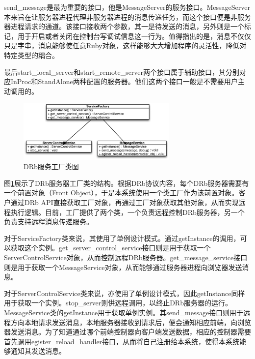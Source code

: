 send\_message是最为重要的接口，他是MessageServer的服务接口。MessageServer本来旨在让服务器进程代理非服务器进程的消息传递任务，而这个接口便是非服务器进程请求的通道。该接口接收两个参数，其一是待发送的消息，另外则是一个标记，用于开启或者关闭在控制台写调试信息这一行为。值得指出的是，消息不仅仅只是字串，消息能够使任意Ruby对象，这样能够大大增加程序的灵活性，降低对特定类型的耦合。

最后start\_local\_server和start\_remote\_server两个接口属于辅助接口，其分别对应InProc和StandAlone两种配置的服务器。他们这两个接口一般是不需要用户主动调用的。

\begin{figure}[h]
\centering
\includegraphics[width=0.7\textwidth]{images/detail/factory_class.eps}
\caption{DRb服务工厂类图}
\label{fig-factory-class}
\end{figure}

图\ref{fig-factory-class}展示了DRb服务器工厂类的结构。根据DRb协议内容，每个DRb服务器需要有一个前置对象（Front Object），于是本系统使用一个类工厂作为该前置对象。客户通过DRb API直接获取工厂对象，再通过工厂对象获取其他对象，从而实现远程执行逻辑。目前，工厂提供了两个类，一个负责远程控制DRb服务器，另一个负责支持远程消息传递服务。

对于ServiceFactory类来说，其使用了单例设计模式。通过getInstance的调用，可以获取这个实例。get\_server\_control\_service接口则是用于获取一个ServerControlService对象，从而控制远程DRb服务器。get\_message\_service接口则是用于获取一个MessageService对象，从而能够通过服务器进程向浏览器发送消息。

对于ServerControlService类来说，亦使用了单例设计模式，因此getInstance同样用于获取一个实例。stop\_server则供远程调用，以终止DRb服务器的运行。MessageService类的getInstance用于获取单例实例。其send\_message接口则用于远程方向本地请求发送消息，本地服务器接收到请求后，便会通知相应前端，向浏览器发送消息。为了知道通过哪个前端控制器向客户端发送数据，相应的控制器需要首先调用egister\_reload\_handler接口，从而将自己注册给本系统，使得本系统能够通知其发送消息。

